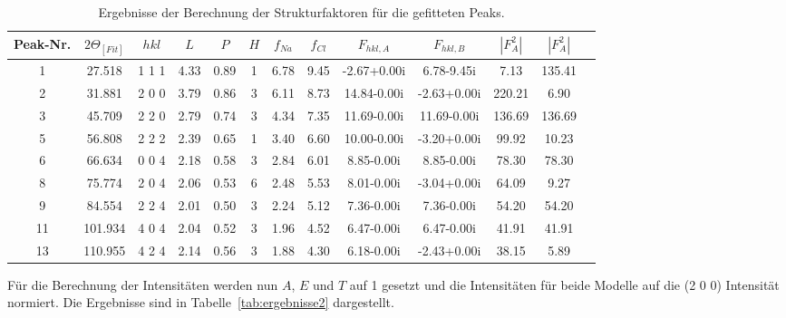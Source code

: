 \begin{table}[h!]
    \centering
\begin{tabular}{|c|c|c|c|c|c|c|c|c|c|c|c|c|}
    \hline
   Peak-Nr. & $2\Theta_[Fit]$& $hkl$ & $L$ & $P$ & $H$ & $f_{Na}$ & $f_{Cl}$ & $F_{hkl, A}$& $F_{hkl, B}$ & $\left|F_A^2\right|$ & $\left|F_A^2\right|$ \\ [0.5ex]
   \hline\hline
   1 & 27.518 & 1 1 1&4.33 & 0.89 & 1 & 6.78 & 9.45 & -2.67+0.00i & 6.78-9.45i & 7.13 & 135.41 \\
   2 & 31.881 &2 0 0& 3.79 & 0.86 & 3 & 6.11 & 8.73 & 14.84-0.00i & -2.63+0.00i & 220.21 & 6.90 \\
   3 & 45.709 &2 2 0& 2.79 & 0.74 & 3 & 4.34 & 7.35 & 11.69-0.00i & 11.69-0.00i & 136.69 & 136.69 \\
   5 & 56.808 &2 2 2& 2.39 & 0.65 & 1 & 3.40 & 6.60 & 10.00-0.00i & -3.20+0.00i & 99.92 & 10.23 \\
   6 & 66.634 &0 0 4& 2.18 & 0.58 & 3 & 2.84 & 6.01 & 8.85-0.00i & 8.85-0.00i & 78.30 & 78.30 \\
   8 & 75.774 &2 0 4& 2.06 & 0.53 & 6 & 2.48 & 5.53 & 8.01-0.00i & -3.04+0.00i & 64.09 & 9.27 \\
   9 & 84.554 &2 2 4& 2.01 & 0.50 & 3 & 2.24 & 5.12 & 7.36-0.00i & 7.36-0.00i & 54.20 & 54.20 \\
   11 &101.934 &4 0 4& 2.04 & 0.52 & 3 & 1.96 & 4.52 & 6.47-0.00i & 6.47-0.00i & 41.91 & 41.91 \\
   13 & 110.955 &4 2 4& 2.14 & 0.56 & 3 & 1.88 & 4.30 & 6.18-0.00i & -2.43+0.00i & 38.15 & 5.89 \\ [1ex]
   \hline
   \end{tabular}    
   \caption[short]{Ergebnisse der Berechnung der Strukturfaktoren für die gefitteten Peaks.}
   \label{tab:ergebnisse}
\end{table}

Für die Berechnung der Intensitäten werden nun $A$, $E$ und $T$ auf 1 gesetzt und die Intensitäten für beide Modelle auf die (2 0 0) Intensität normiert. Die Ergebnisse sind in Tabelle~\ref{tab:ergebnisse2} dargestellt.

